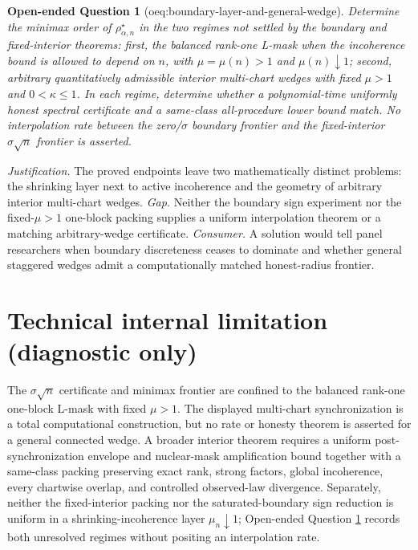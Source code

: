 \documentclass{article}
\newtheorem{openendedquestion}{Open-ended Question}
\begin{document}
\begin{openendedquestion}[oeq:boundary-layer-and-general-wedge]\label{oeq:boundary-layer-and-general-wedge}
Determine the minimax order of \(\rho_{\alpha,n}^{\star}\) in the two regimes not settled by the boundary and fixed-interior theorems: first, the balanced rank-one L-mask when the incoherence bound is allowed to depend on \(n\), with \(\mu=\mu(n)>1\) and \(\mu(n)\downarrow1\); second, arbitrary quantitatively admissible interior multi-chart wedges with fixed \(\mu>1\) and \(0<\kappa\le1\).  In each regime, determine whether a polynomial-time uniformly honest spectral certificate and a same-class all-procedure lower bound match.  No interpolation rate between the zero/\(\sigma\) boundary frontier and the fixed-interior \(\sigma\sqrt n\) frontier is asserted.
\end{openendedquestion}
\par\smallskip\noindent \textit{Justification.} The proved endpoints leave two mathematically distinct problems: the shrinking layer next to active incoherence and the geometry of arbitrary interior multi-chart wedges. \textit{Gap.} Neither the boundary sign experiment nor the fixed-\(\mu>1\) one-block packing supplies a uniform interpolation theorem or a matching arbitrary-wedge certificate. \textit{Consumer.} A solution would tell panel researchers when boundary discreteness ceases to dominate and whether general staggered wedges admit a computationally matched honest-radius frontier.

\section*{Technical internal limitation (diagnostic only)}

The \(\sigma\sqrt n\) certificate and minimax frontier are confined to the balanced rank-one one-block L-mask with fixed \(\mu>1\). The displayed multi-chart synchronization is a total computational construction, but no rate or honesty theorem is asserted for a general connected wedge. A broader interior theorem requires a uniform post-synchronization envelope and nuclear-mask amplification bound together with a same-class packing preserving exact rank, strong factors, global incoherence, every chartwise overlap, and controlled observed-law divergence. Separately, neither the fixed-interior packing nor the saturated-boundary sign reduction is uniform in a shrinking-incoherence layer \(\mu_n\downarrow1\); Open-ended Question \ref{oeq:boundary-layer-and-general-wedge} records both unresolved regimes without positing an interpolation rate.
\end{document}
